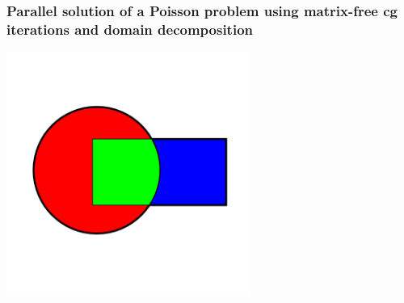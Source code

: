 \documentclass{beamer}
\begin{document}
\begin{frame}\frametitle{Parallel solution of a Poisson problem using
                         matrix-free cg iterations and domain decomposition}
  \begin{center}
    \includegraphics[width=8cm]{dd}
  \end{center}
\end{frame}
\end{document}
